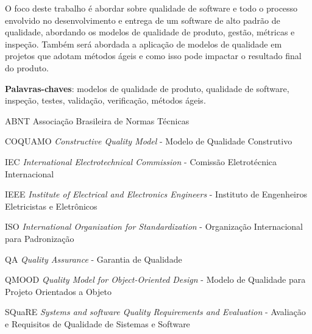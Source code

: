 \documentclass[
	12pt,				%
	openright,			%
	oneside,			%
	a4paper,			%
	english,			%
	brazil,				%
	]{abntex2}
\begin{document}
\frenchspacing 


\imprimircapa

\imprimirfolhaderosto


\begin{resumo}
 O foco deste trabalho é abordar sobre qualidade de software e todo o processo envolvido no desenvolvimento e entrega de um software de alto padrão de qualidade, abordando os modelos de qualidade de produto, gestão, métricas e inspeção. Também será abordada a aplicação de modelos de qualidade em projetos que adotam métodos ágeis e como isso pode impactar o resultado final do produto.

 \vspace{\onelineskip}
    
 \noindent
 \textbf{Palavras-chaves}: modelos de qualidade de produto, qualidade de software, inspeção, testes, validação, verificação, métodos ágeis.
\end{resumo}

\listoffigures*
\cleardoublepage

\listoftables*
\cleardoublepage

\begin{siglas}
    \item[ABNT] Associação Brasileira de Normas Técnicas
    \item[COQUAMO] \emph{Constructive Quality Model} - Modelo de Qualidade Construtivo
    \item[IEC] \emph{International Electrotechnical Commission} - Comissão Eletrotécnica Internacional
    \item[IEEE] \emph{Institute of Electrical and Electronics Engineers} - Instituto de Engenheiros Eletricistas e Eletrônicos
    \item[ISO] \emph{International Organization for Standardization} - Organização Internacional para Padronização
    \item[QA] \emph{Quality Assurance} - Garantia de Qualidade
    \item[QMOOD] \emph{Quality Model for Object-Oriented Design} - Modelo de Qualidade
para Projeto Orientados a Objeto
    \item[SQuaRE] \emph{Systems and software Quality Requirements and Evaluation} - Avaliação e Requisitos de Qualidade de Sistemas e Software
\end{siglas}
\end{document}
